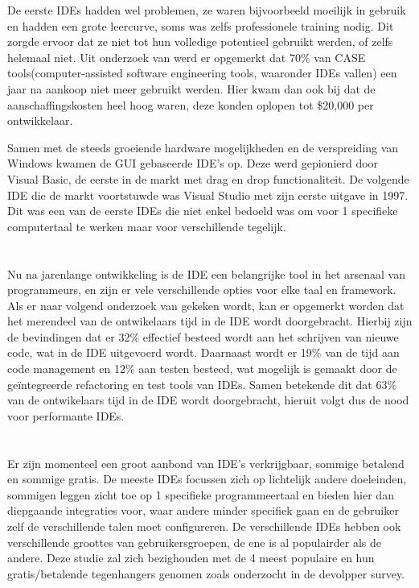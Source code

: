 De eerste IDEs hadden wel problemen, ze waren bijvoorbeeld moeilijk in gebruik en hadden een grote leercurve, soms was zelfs professionele training nodig. Dit zorgde ervoor dat ze niet tot hun volledige potentieel gebruikt werden, of zelfs helemaal niet. Uit onderzoek van \textcite{Kline2005} werd er opgemerkt dat 70\% van CASE tools(computer-assisted software engineering tools, waaronder IDEs vallen) een jaar na aankoop niet meer gebruikt werden. Hier kwam dan ook bij dat de aanschaffingskosten heel hoog waren, deze konden oplopen tot \$20,000 per ontwikkelaar.

Samen met de steeds groeiende hardware mogelijkheden en de verspreiding van Windows kwamen de GUI gebaseerde IDE’s op. Deze werd gepionierd door Visual Basic, de eerste in de markt met drag en drop functionaliteit. De volgende IDE die de markt voortstuwde was Visual Studio met zijn eerste uitgave in 1997. Dit was een van de eerste IDEs die niet enkel bedoeld was om voor 1 specifieke computertaal te werken maar voor verschillende tegelijk. 

\section{}
\label{sec:IDE-nood}

Nu na jarenlange ontwikkeling is de IDE een belangrijke tool in het arsenaal van programmeurs, en zijn er vele verschillende opties voor elke taal en framework. Als er naar volgend onderzoek van \textcite{Tidelift2019} gekeken wordt, kan er opgemerkt worden dat het merendeel van de ontwikelaars tijd in de IDE wordt doorgebracht. Hierbij zijn de bevindingen dat er 32\% effectief besteed wordt aan het schrijven van nieuwe code, wat in de IDE uitgevoerd wordt. Daarnaast wordt er 19\% van de tijd aan code management en 12\% aan testen besteed, wat mogelijk is gemaakt door de geïntegreerde refactoring en test tools van IDEs. Samen betekende dit dat 63\% van de ontwikelaars tijd in de IDE wordt doorgebracht, hieruit volgt dus de nood voor performante IDEs.

\section{}
\label{sec:IDE-prominent}

Er zijn momenteel een groot aanbond van IDE’s verkrijgbaar, sommige betalend en sommige gratis. De meeste IDEs focussen zich op lichtelijk andere doeleinden, sommigen leggen zicht toe op 1 specifieke programmeertaal en bieden hier dan diepgaande integraties voor, waar andere minder specifiek gaan en de gebruiker zelf de verschillende talen moet configureren. De verschillende IDEs hebben ook verschillende groottes van gebruikersgroepen, de ene is al populairder als de andere. Deze studie zal zich bezighouden met de 4 meest populaire en hun gratis/betalende tegenhangers genomen zoals onderzocht in de \textcite{StackOverflow2021} devolpper survey. 

